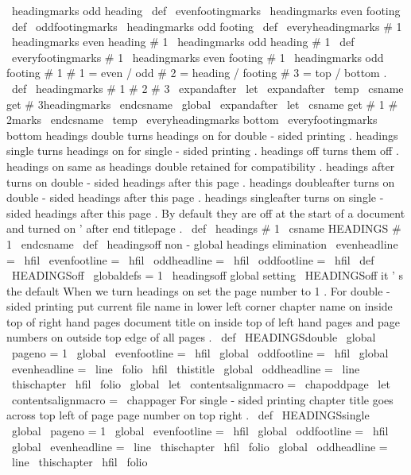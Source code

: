 {{{{
\
headingmarks
{
odd
}
{
heading
}
}
\
def
\
evenfootingmarks
{
\
headingmarks
{
even
}
{
footing
}
}
\
def
\
oddfootingmarks
{
\
headingmarks
{
odd
}
{
footing
}
}
\
def
\
everyheadingmarks
#
1
{
\
headingmarks
{
even
}
{
heading
}
{
#
1
}
\
headingmarks
{
odd
}
{
heading
}
{
#
1
}
}
\
def
\
everyfootingmarks
#
1
{
\
headingmarks
{
even
}
{
footing
}
{
#
1
}
\
headingmarks
{
odd
}
{
footing
}
{
#
1
}
}
%
#
1
=
even
/
odd
#
2
=
heading
/
footing
#
3
=
top
/
bottom
.
\
def
\
headingmarks
#
1
#
2
#
3
{
%
\
expandafter
\
let
\
expandafter
\
temp
\
csname
get
#
3headingmarks
\
endcsname
\
global
\
expandafter
\
let
\
csname
get
#
1
#
2marks
\
endcsname
\
temp
}
\
everyheadingmarks
bottom
\
everyfootingmarks
bottom
%
headings
double
turns
headings
on
for
double
-
sided
printing
.
%
headings
single
turns
headings
on
for
single
-
sided
printing
.
%
headings
off
turns
them
off
.
%
headings
on
same
as
headings
double
retained
for
compatibility
.
%
headings
after
turns
on
double
-
sided
headings
after
this
page
.
%
headings
doubleafter
turns
on
double
-
sided
headings
after
this
page
.
%
headings
singleafter
turns
on
single
-
sided
headings
after
this
page
.
%
By
default
they
are
off
at
the
start
of
a
document
%
and
turned
on
'
after
end
titlepage
.
\
def
\
headings
#
1
{
\
csname
HEADINGS
#
1
\
endcsname
}
\
def
\
headingsoff
{
%
non
-
global
headings
elimination
\
evenheadline
=
{
\
hfil
}
\
evenfootline
=
{
\
hfil
}
%
\
oddheadline
=
{
\
hfil
}
\
oddfootline
=
{
\
hfil
}
%
}
\
def
\
HEADINGSoff
{
{
\
globaldefs
=
1
\
headingsoff
}
}
%
global
setting
\
HEADINGSoff
%
it
'
s
the
default
%
When
we
turn
headings
on
set
the
page
number
to
1
.
%
For
double
-
sided
printing
put
current
file
name
in
lower
left
corner
%
chapter
name
on
inside
top
of
right
hand
pages
document
%
title
on
inside
top
of
left
hand
pages
and
page
numbers
on
outside
top
%
edge
of
all
pages
.
\
def
\
HEADINGSdouble
{
%
\
global
\
pageno
=
1
\
global
\
evenfootline
=
{
\
hfil
}
\
global
\
oddfootline
=
{
\
hfil
}
\
global
\
evenheadline
=
{
\
line
{
\
folio
\
hfil
\
thistitle
}
}
\
global
\
oddheadline
=
{
\
line
{
\
thischapter
\
hfil
\
folio
}
}
\
global
\
let
\
contentsalignmacro
=
\
chapoddpage
}
\
let
\
contentsalignmacro
=
\
chappager
%
For
single
-
sided
printing
chapter
title
goes
across
top
left
of
page
%
page
number
on
top
right
.
\
def
\
HEADINGSsingle
{
%
\
global
\
pageno
=
1
\
global
\
evenfootline
=
{
\
hfil
}
\
global
\
oddfootline
=
{
\
hfil
}
\
global
\
evenheadline
=
{
\
line
{
\
thischapter
\
hfil
\
folio
}
}
\
global
\
oddheadline
=
{
\
line
{
\
thischapter
\
hfil
\
folio
}
}}}}}
